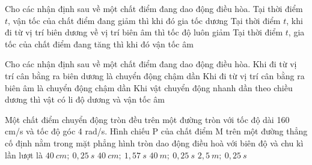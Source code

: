\begin{ex}%
Cho các nhận định sau về một chất điểm đang dao động điều hòa.
{\True Tại thời điểm $t$, vận tốc của chất điểm đang giảm thì khi đó gia tốc dương}
{Tại thời điểm $t$, khi đi từ vị trí biên dương về vị trí biên âm thì tốc độ luôn giảm}
{\True Tại thời điểm $t$, gia tốc của chất điểm đang tăng thì khi đó vận tốc âm}
\loigiai{
\begin{itemchoice}
\itemch
\itemch
\itemch
\itemch
\end{itemchoice}
}
\end{ex} 
\begin{ex}%
Cho các nhận định sau về một chất điểm đang dao động điều hòa.
{\True Khi đi từ vị trí cân bằng ra biên dương là chuyển động chậm dần}
{\True Khi đi từ vị trí cân bằng ra biên âm là chuyển động chậm dần}
{Khi vật chuyển động nhanh dần theo chiều dương thì vật có li độ dương và vận tốc âm} \loigiai{
\begin{itemchoice}
\itemch
\itemch
\itemch
\itemch
\end{itemchoice}
}
\end{ex} 
\begin{ex}%
Một chất điểm chuyển động tròn đều trên một đường tròn với tốc độ dài 160 cm/s và tốc độ góc 4 rad/s. Hình chiếu P của chất điểm M trên một đường thẳng cố định nằm trong mặt phẳng hình tròn dao động điều hoà với biên độ và chu kì lần lượt là
\choice
{$40\ cm;\ 0,25\ s$}
{\True $40\ cm;\ 1,57\ s$}
{$40\ m;\ 0,25\ s$}
{$2,5\ m;\ 0,25\ s$}
\end{ex} 


